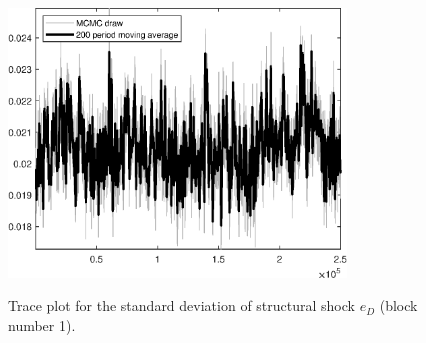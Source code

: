 \begin{figure}[H]
\centering
  \includegraphics[width=0.8\textwidth]{BRS_imp_mobility_alt/graphs/TracePlot_SE_e_D_blck_1}\\
    \caption{Trace plot for the standard deviation of structural shock ${e_D}$ (block number 1).}
\end{figure}
